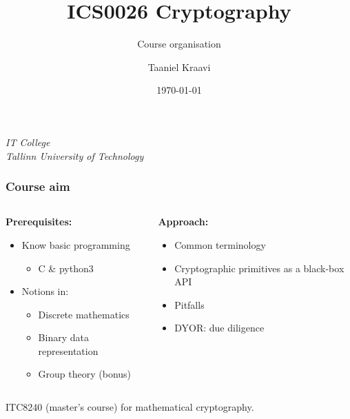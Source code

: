 \usepackage{graphicx}

\title{ICS0026 Cryptography}
\subtitle{Course organisation}
\date{\today}
\author{Taaniel Kraavi}
\institute%
{%
  \textit{IT College}\\
  \textit{Tallinn University of Technology}
}


\begin{frame}
  \titlepage
\end{frame}

\begin{frame}
  \frametitle{Course aim}

  \begin{columns}[T]
    \begin{column}{.5\textwidth}
      \textbf{Prerequisites:}
      \begin{itemize}[<+->]
        \pause
        \item Know basic programming
        \begin{itemize}
          \item C \& python3
        \end{itemize}
        \item Notions in:
        \begin{itemize}
          \item Discrete mathematics
          \item Binary data representation
          \item Group theory (bonus)
        \end{itemize}
      \end{itemize}
    \end{column}

    \pause
    \begin{column}{.4\textwidth}
      \textbf{Approach:}
      \begin{itemize}[<+->]
        \item Common terminology
        \item Cryptographic primitives as a black-box API
        \item Pitfalls
        \item DYOR: due diligence
      \end{itemize}
    \end{column}
  \end{columns}

  \vspace*{2em}

  \pause
  ITC8240 (master's course) for mathematical cryptography.
\end{frame}


